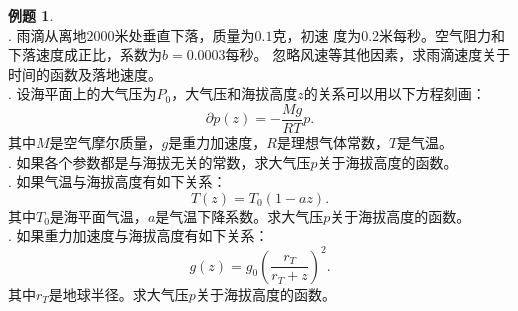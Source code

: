 \documentclass[12pt,UTF8]{ctexbook}
\theoremstyle{definition}
\newtheorem{et}{例题}[section]
\theoremstyle{plain}
\begin{document}
\begin{et}
    \mbox{} \\
    . 雨滴从离地$2000$米处垂直下落，质量为$0.1$克，初速
    度为$0.2$米每秒。空气阻力和下落速度成正比，系数为$b=0.0003$每秒。
    忽略风速等其他因素，求雨滴速度关于时间的函数及落地速度。\\
    . 设海平面上的大气压为$P_0$，大气压和海拔高度$z$的关系可以用以下方程刻画：
    $$ \partial p(z) = -\frac{Mg}{RT} p. $$
    其中$M$是空气摩尔质量，$g$是重力加速度，$R$是理想气体常数，$T$是气温。\\
    . 如果各个参数都是与海拔无关的常数，求大气压$p$关于海拔高度的函数。\\
    . 如果气温与海拔高度有如下关系：
    $$ T(z) = T_0(1 - az).$$
    其中$T_0$是海平面气温，$a$是气温下降系数。求大气压$p$关于海拔高度的函数。\\
    . 如果重力加速度与海拔高度有如下关系：
    $$ g(z) = g_0 \left(\frac{r_T}{r_T + z}\right)^2. $$
    其中$r_T$是地球半径。求大气压$p$关于海拔高度的函数。

\end{et}
\end{document}
